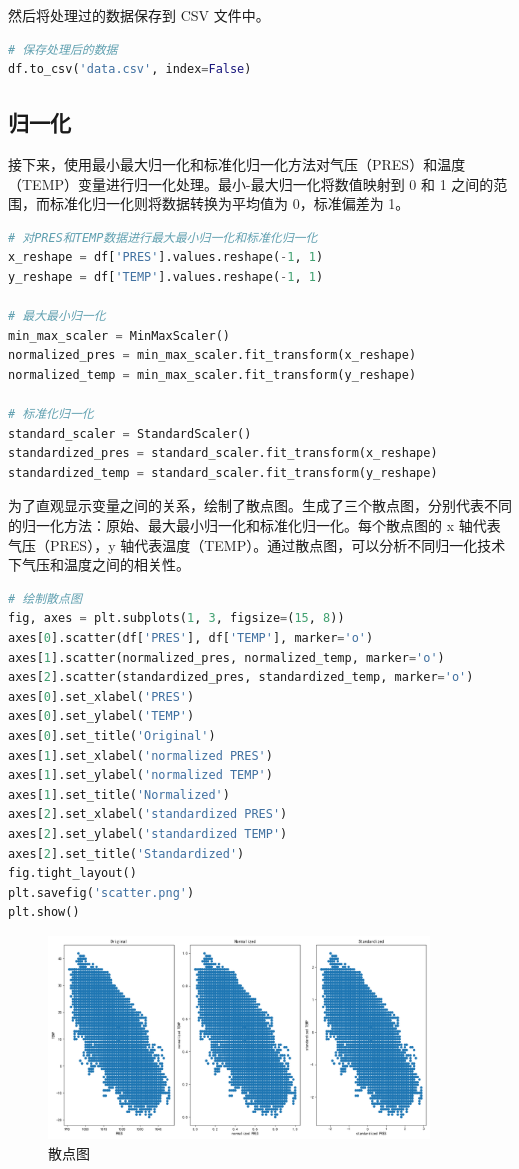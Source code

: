\documentclass[lang=cn,11pt,a4paper]{elegantpaper}
\begin{document}
然后将处理过的数据保存到 CSV 文件中。

\begin{lstlisting}[language=python]
# 保存处理后的数据
df.to_csv('data.csv', index=False)
\end{lstlisting}

\subsection{归一化}
接下来，使用最小最大归一化和标准化归一化方法对气压（PRES）和温度（TEMP）变量进行归一化处理。最小-最大归一化将数值映射到 0 和 1 之间的范围，而标准化归一化则将数据转换为平均值为 0，标准偏差为 1。
\begin{lstlisting}[language=python]
# 对PRES和TEMP数据进行最大最小归一化和标准化归一化
x_reshape = df['PRES'].values.reshape(-1, 1)
y_reshape = df['TEMP'].values.reshape(-1, 1)

# 最大最小归一化
min_max_scaler = MinMaxScaler()
normalized_pres = min_max_scaler.fit_transform(x_reshape)
normalized_temp = min_max_scaler.fit_transform(y_reshape)

# 标准化归一化
standard_scaler = StandardScaler()
standardized_pres = standard_scaler.fit_transform(x_reshape)
standardized_temp = standard_scaler.fit_transform(y_reshape)
\end{lstlisting}

为了直观显示变量之间的关系，绘制了散点图。生成了三个散点图，分别代表不同的归一化方法：原始、最大最小归一化和标准化归一化。每个散点图的 x 轴代表气压（PRES），y 轴代表温度（TEMP）。通过散点图，可以分析不同归一化技术下气压和温度之间的相关性。
\begin{lstlisting}[language=python]
# 绘制散点图
fig, axes = plt.subplots(1, 3, figsize=(15, 8))
axes[0].scatter(df['PRES'], df['TEMP'], marker='o')
axes[1].scatter(normalized_pres, normalized_temp, marker='o')
axes[2].scatter(standardized_pres, standardized_temp, marker='o')
axes[0].set_xlabel('PRES')
axes[0].set_ylabel('TEMP')
axes[0].set_title('Original')
axes[1].set_xlabel('normalized PRES')
axes[1].set_ylabel('normalized TEMP')
axes[1].set_title('Normalized')
axes[2].set_xlabel('standardized PRES')
axes[2].set_ylabel('standardized TEMP')
axes[2].set_title('Standardized')
fig.tight_layout()
plt.savefig('scatter.png')
plt.show()
\end{lstlisting}

\begin{figure}[H]
    \centering
    \includegraphics[width=0.9\textwidth]{image/scatter.png}
    \caption{散点图}
\end{figure}
\end{document}
